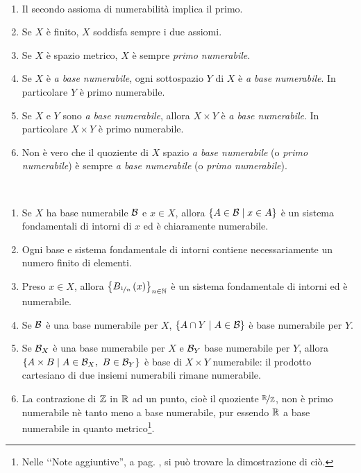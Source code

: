 \begin{observes}~{}
\begin{enumerate}
\item Il secondo assioma di numerabilità implica il primo.
\item Se $X$ è finito, $X$ soddisfa sempre i due assiomi.
\item Se $X$ è spazio metrico, $X$ è sempre \textit{primo numerabile}.
\item Se $X$ è \textit{a base numerabile}, ogni sottospazio $Y$ di $X$ è \textit{a base numerabile}. In particolare $Y$ è primo numerabile.
\item Se $X$ e $Y$ sono \textit{a base numerabile}, allora $X\times Y$ è \textit{a base numerabile}. In particolare $X\times Y$ è primo numerabile.
\item Non è vero che il quoziente di $X$ spazio \textit{a base numerabile} (o \textit{primo numerabile}) è sempre \textit{a base numerabile} (o \textit{primo numerabile}).
\end{enumerate}
\vspace{-3mm}
\end{observes}
\begin{demonstration}~{}
\begin{enumerate}[label=\Roman*]
	\item Se $X$ ha base numerabile $\mathcal{B}$ e $x\in X$, allora $\left\{A\in \mathcal{B}\mid x\in A\right\}$ è un sistema fondamentali di intorni di $x$ ed è chiaramente numerabile.
	\item Ogni base e sistema fondamentale di intorni contiene necessariamente un numero finito di elementi.
	\item Preso $x\in X$, allora $\left\{B_{\nicefrac{1}{n}}\left(x\right)\right\}_{n\in\mathbb{N}}$ è un sistema fondamentale di intorni ed è numerabile.
	\item Se $\mathcal{B}$ è una base numerabile per $X$, $\left\{A\cap Y\mid A\in \mathcal{B}\right\}$ è base numerabile per $Y$.
	\item Se $\mathcal{B}_X$ è una base numerabile per $X$ e $\mathcal{B}_Y$ base numerabile per $Y$, allora $\left\{A\times B\mid A\in \basis_X,\ B\in\basis_Y\right\}$ è base di $X\times Y$ numerabile: il prodotto cartesiano di due insiemi numerabili rimane numerabile.
	\item La contrazione di $\mathbb{Z}$ in $\mathbb{R}$ ad un punto, cioè il quoziente $\nicefrac{\mathbb{R}}{\mathbb{Z}}$, non è primo numerabile nè tanto meno a base numerabile, pur essendo $\mathbb{R}$ a base numerabile in quanto metrico\footnote{Nelle ‘‘Note aggiuntive'', a pag. \pageref{dimostrazionenonnumerabilità}, si può trovare la dimostrazione di ciò.}.
\end{enumerate}
\vspace{-3mm}
\end{demonstration}
